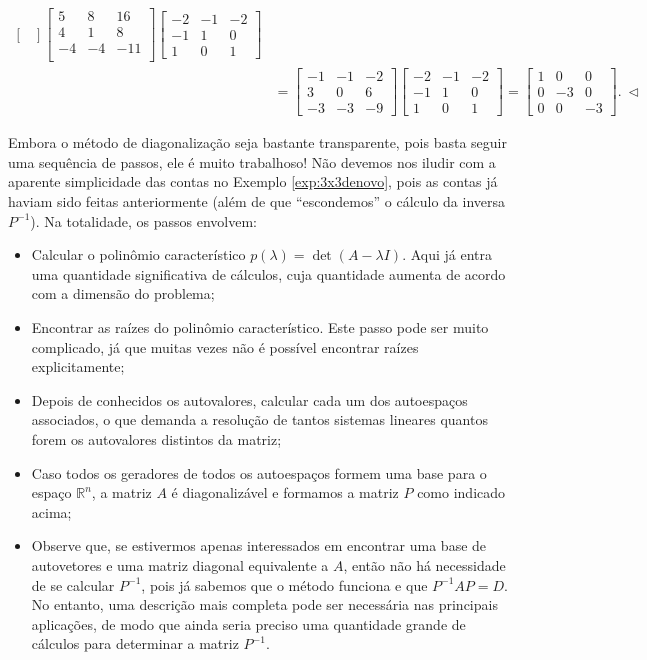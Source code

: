 \begin{ex}
\begin{align*}
\begin{bmatrix}
	\end{bmatrix}
	\begin{bmatrix}
	5 & 8 & 16 \\ 4 & 1 & 8 \\ -4 & -4 & -11 \\
	\end{bmatrix}
	\begin{bmatrix}
	-2&-1&-2 \\ -1&1&0 \\ 1&0&1
	\end{bmatrix} \\
	& =
	\begin{bmatrix}
	-1&-1&-2 \\ 3&0&6 \\ -3&-3&-9
	\end{bmatrix}
	\begin{bmatrix}
	-2&-1&-2 \\ -1&1&0 \\ 1&0&1
	\end{bmatrix} =
	\begin{bmatrix}
	1&0&0 \\ 0&-3&0 \\ 0&0&-3
	\end{bmatrix}. \ \lhd
          \end{align*}
\end{ex}

Embora o método de diagonalização seja bastante transparente, pois basta seguir uma sequência de passos, ele é muito trabalhoso! Não devemos nos iludir com a aparente simplicidade das contas no Exemplo \ref{exp:3x3denovo}, pois as contas já haviam sido feitas anteriormente (além de que ``escondemos'' o cálculo da inversa $P^{-1}$). Na totalidade, os passos envolvem:
\begin{itemize}
\item Calcular o polinômio característico $p(\lambda) = \det (A - \lambda I)$. Aqui já entra uma quantidade significativa de cálculos, cuja quantidade aumenta de acordo com a dimensão do problema;
\item Encontrar as raízes do polinômio característico. Este passo pode ser muito complicado, já que muitas vezes não é possível encontrar raízes explicitamente;
\item Depois de conhecidos os autovalores, calcular cada um dos autoespaços associados, o que demanda a resolução de tantos sistemas lineares quantos forem os autovalores distintos da matriz;
\item Caso todos os geradores de todos os autoespaços formem uma base para o espaço $\mathbb{R}^n$, a matriz $A$ é diagonalizável e formamos a matriz $P$ como indicado acima;
\item Observe que, se estivermos apenas interessados em encontrar uma base de autovetores e uma matriz diagonal equivalente a $A$, então não há necessidade de se calcular $P^{-1}$, pois já sabemos que o método funciona e que $P^{-1} AP = D$. No entanto, uma descrição mais completa pode ser necessária nas principais aplicações, de modo que ainda seria preciso uma quantidade grande de cálculos para determinar a matriz $P^{-1}$.
\end{itemize}

